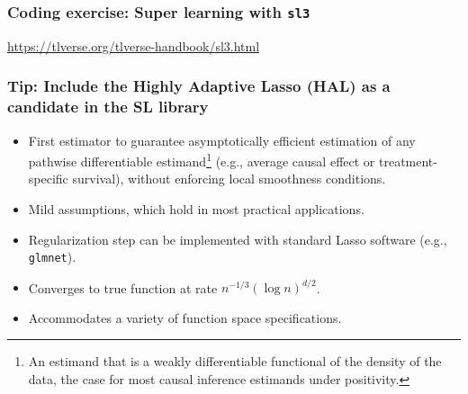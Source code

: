 \documentclass[t]{beamer}
\begin{document}
\begin{frame}
  \frametitle{Coding exercise: Super learning with \texttt{sl3}}
  \url{https://tlverse.org/tlverse-handbook/sl3.html}
\end{frame}


\begin{frame}
\frametitle{Tip: Include the Highly Adaptive Lasso (HAL) as a candidate in the SL library}
\begin{itemize}
    \item First estimator to guarantee asymptotically efficient estimation of
      any pathwise differentiable estimand\footnote{An estimand that is a weakly
      differentiable functional of the density of the data, the case for most
      causal inference estimands under positivity.} (e.g., average causal effect
      or treatment-specific survival), without enforcing local smoothness
      conditions.
    \item Mild assumptions, which hold in most practical applications.
    \item Regularization step can be implemented with standard Lasso software
      (e.g., \texttt{glmnet}).
    \item Converges to true function at rate $n^{-1/3}(\log n)^{d/2}$.
    \item Accommodates a variety of function space specifications.
\end{itemize}
\end{frame}
\end{document}
